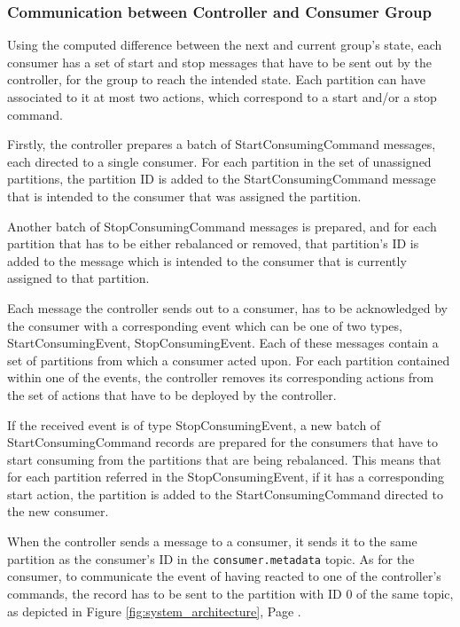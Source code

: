 \subsubsection{Communication between Controller and Consumer Group}
\label{sub:controller_communication_cosumer}

Using the computed difference between the next and current group's state, each
consumer has a set of start and stop messages that have to be sent out by the
controller, for the group to reach the intended state. Each partition can have
associated to it at most two actions, which correspond to a start and/or a stop
command. 

Firstly, the controller prepares a batch of StartConsumingCommand messages, each
directed to a single consumer. For each partition in the set of unassigned
partitions, the partition ID is added to the StartConsumingCommand message that
is intended to the consumer that was assigned the partition.

Another batch of StopConsumingCommand messages is prepared, and for each
partition that has to be either rebalanced or removed, that partition's ID is
added to the message which is intended to the consumer that is currently
assigned to that partition. 

Each message the controller sends out to a consumer, has to be acknowledged by
the consumer with a corresponding event which can be one of two types,
StartConsumingEvent, StopConsumingEvent. Each of these messages contain a set of
partitions from which a consumer acted upon. For each partition contained within
one of the events, the controller removes its corresponding actions from the set
of actions that have to be deployed by the controller. 

If the received event is of type StopConsumingEvent, a new batch of
StartConsumingCommand records are prepared for the consumers that have to start
consuming from the partitions that are being rebalanced. This means that for
each partition referred in the StopConsumingEvent, if it has a corresponding
start action, the partition is added to the StartConsumingCommand directed to
the new consumer. 

When the controller sends a message to a consumer, it sends it to the same
partition as the consumer's ID in the \lstinline{consumer.metadata} topic. As for
the consumer, to communicate the event of having reacted to one of the
controller's commands, the record has to be sent to the partition with ID $0$ of
the same topic, as depicted in Figure \ref{fig:system_architecture}, Page
\pageref{fig:system_architecture}.

